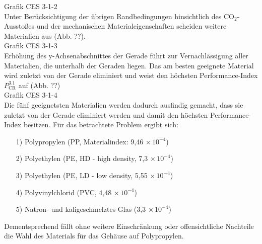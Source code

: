 Grafik CES 3-1-2\\
Unter Berücksichtigung der übrigen Randbedingungen hinsichtlich des CO$_2$-Ausstoßes und der mechanischen Materialeigenschaften scheiden weitere Materialien aus (Abb. ??).\\
Grafik CES 3-1-3\\
Erhöhung des y-Achsenabschnittes der Gerade führt zur Vernachlässigung aller Materialien, die unterhalb der Geraden liegen. Das am besten geeignete Material wird zuletzt von der Gerade eliminiert und weist den höchsten Performance-Index $P_{\text{CR}}^{3.1}$ auf (Abb. ??)\\
Grafik CES 3-1-4\\
Die fünf geeignetsten Materialien werden dadurch ausfindig gemacht, dass sie zuletzt von der Gerade eliminiert werden und damit den höchsten Performance-Index besitzen. Für das betrachtete Problem ergibt sich:
\begin{itemize}
\item[1)] Polypropylen (PP, Materialindex: 9,46$\,\times10^{-4}$)
\item[2)] Polyethylen (PE, HD - high density, 7,3$\,\times10^{-4}$)
\item[3)] Polyethylen (PE, LD - low density, 5,55$\,\times10^{-4}$)
\item[4)] Polyvinylchlorid (PVC, 4,48$\,\times10^{-4}$)
\item[5)] Natron- und kaligeschmelztes Glas (3,3$\,\times10^{-4}$)
\end{itemize}
Dementsprechend fällt ohne weitere Einschränkung oder offensichtliche Nachteile die Wahl des Materials für das Gehäuse auf Polypropylen.

